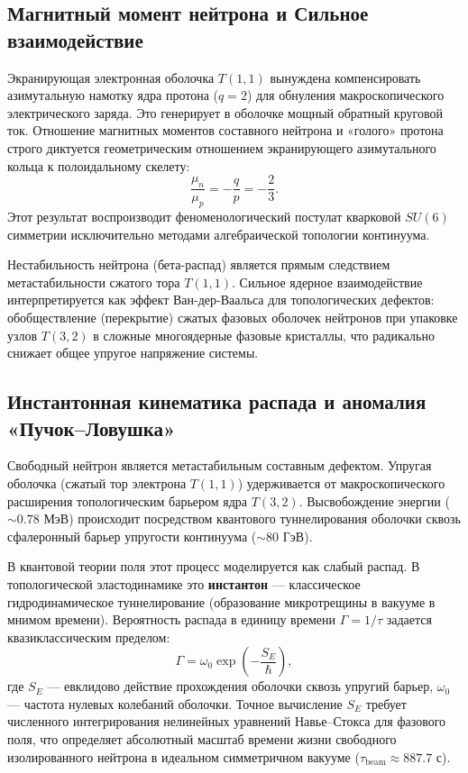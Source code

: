 \documentclass[11pt,a4paper]{article}
\begin{document}
	\subsection{Магнитный момент нейтрона и Сильное взаимодействие}
	Экранирующая электронная оболочка $T(1,1)$ вынуждена компенсировать азимутальную намотку ядра протона ($q=2$) для обнуления макроскопического электрического заряда. Это генерирует в оболочке мощный обратный круговой ток. Отношение магнитных моментов составного нейтрона и «голого» протона строго диктуется геометрическим отношением экранирующего азимутального кольца к полоидальному скелету:
	\begin{equation}
		\frac{\mu_n}{\mu_p} = -\frac{q}{p} = -\frac{2}{3}.
	\end{equation}
	Этот результат воспроизводит феноменологический постулат кварковой $SU(6)$ симметрии исключительно методами алгебраической топологии континуума.
	
	Нестабильность нейтрона (бета-распад) является прямым следствием метастабильности сжатого тора $T(1,1)$. Сильное ядерное взаимодействие интерпретируется как эффект Ван-дер-Ваальса для топологических дефектов: обобществление (перекрытие) сжатых фазовых оболочек нейтронов при упаковке узлов $T(3,2)$ в сложные многоядерные фазовые кристаллы, что радикально снижает общее упругое напряжение системы.
	
	\subsection{Инстантонная кинематика распада и аномалия «Пучок–Ловушка»}
	Свободный нейтрон является метастабильным составным дефектом. Упругая оболочка (сжатый тор электрона $T(1,1)$) удерживается от макроскопического расширения топологическим барьером ядра $T(3,2)$. Высвобождение энергии ($\sim 0.78$ МэВ) происходит посредством квантового туннелирования оболочки сквозь сфалеронный барьер упругости континуума ($\sim 80$ ГэВ). 
	
	В квантовой теории поля этот процесс моделируется как слабый распад. В топологической эластодинамике это \textbf{инстантон} — классическое гидродинамическое туннелирование (образование микротрещины в вакууме в мнимом времени). Вероятность распада в единицу времени $\Gamma = 1/\tau$ задается квазиклассическим пределом:
	\begin{equation}
		\Gamma = \omega_0 \exp\!\left( -\frac{S_E}{\hbar} \right),
	\end{equation}
	где $S_E$ — евклидово действие прохождения оболочки сквозь упругий барьер, $\omega_0$ — частота нулевых колебаний оболочки. Точное вычисление $S_E$ требует численного интегрирования нелинейных уравнений Навье–Стокса для фазового поля, что определяет абсолютный масштаб времени жизни свободного изолированного нейтрона в идеальном симметричном вакууме ($\tau_{\text{beam}} \approx 887.7$ с).
	
\end{document}
